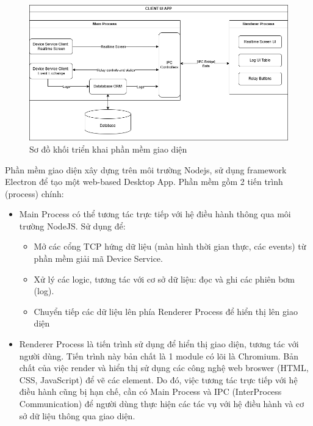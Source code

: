 \begin{figure}[!ht]
     \centering
    \includegraphics[width=0.8\linewidth]{Figures/ClientUI_implementation-block.png}
    \caption{Sơ đồ khối triển khai phần mềm giao diện}
    \label{fig:ClientUI_implementation-block}
\end{figure}

Phần mềm giao diện xây dựng trên môi trường Nodejs, sử dụng framework Electron để tạo một web-based Desktop App. Phần mềm gồm 2 tiến trình (process) chính:

\begin{itemize}
    \item Main Process có thể tương tác trực tiếp với hệ điều hành thông qua môi trường NodeJS. Sử dụng để:
    \begin{itemize}
        \item Mở các cổng TCP hứng dữ liệu (màn hình thời gian thực, các events) từ phần mềm giải mã Device Service.
        \item Xử lý các logic, tương tác với cơ sở dữ liệu: đọc và ghi các phiên bơm (log).
        \item Chuyển tiếp các dữ liệu lên phía Renderer Process để hiển thị lên giao diện
    \end{itemize}

    \item Renderer Process là tiến trình sử dụng để hiển thị giao diện, tương tác với người dùng. Tiến trình này bản chất là 1 module có lõi là Chromium. Bản chất của việc render và hiển thị  sử dụng các công nghệ web broswer (HTML, CSS, JavaScript) để vẽ các element. Do đó, việc tương tác trực tiếp với hệ điều hành cũng bị hạn chế, cần có Main Process và IPC (InterProcess Communication) để người dùng thực hiện các tác vụ với hệ điều hành và cơ sở dữ liệu thông qua giao diện.
    
\end{itemize}

